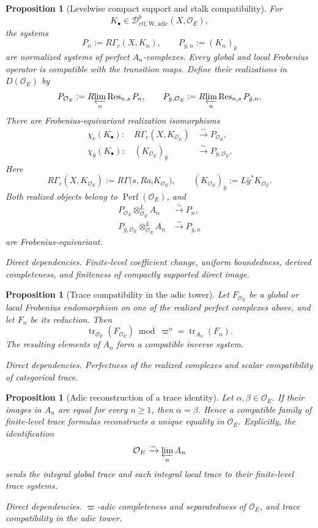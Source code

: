 \documentclass[10pt]{article}
\newtheorem{proposition}[theorem]{Proposition}
\theoremstyle{definition}
\newcommand{\OO}{\mathcal O}
\newcommand{\Perf}{\operatorname{Perf}}
\newcommand{\RGammac}{R\Gamma_c}
\newcommand{\depends}[1]{\par\smallskip\noindent\textit{Direct dependencies.} #1\par}
\begin{document}
\begin{proposition}[Levelwise compact support and stalk compatibility]
For
\[
 K_\bullet\in
 \mathcal D^b_{\mathrm{ctf,W,adic}}(X,\OO_E),
\]
the systems
\[
 P_n:=\RGammac(X,K_n),\qquad
 P_{\bar y,n}:=(K_n)_{\bar y}
\]
are normalized systems of perfect \(A_n\)-complexes.  Every global and local
Frobenius operator is compatible with the transition maps.  Define their
realizations in \(D(\OO_E)\) by
\[
 P_{\OO_E}:=
 R\!\varprojlim_n\operatorname{Res}_{n,s}P_n,\qquad
 P_{\bar y,\OO_E}:=
 R\!\varprojlim_n\operatorname{Res}_{n,s}P_{\bar y,n}.
\]
There are Frobenius-equivariant realization isomorphisms
\[
\begin{aligned}
 \chi_c(K_\bullet):\quad
 \RGammac(X,K_{\OO_E})
 &\xrightarrow{\sim}P_{\OO_E},\\
 \chi_{\bar y}(K_\bullet):\quad
 (K_{\OO_E})_{\bar y}
 &\xrightarrow{\sim}P_{\bar y,\OO_E}.
\end{aligned}
\]
Here
\[
 \RGammac(X,K_{\OO_E})
 :=R\Gamma\bigl(s,Ra_!K_{\OO_E}\bigr),
 \qquad
 (K_{\OO_E})_{\bar y}:=L\bar y^*K_{\OO_E}.
\]
Both realized objects belong to \(\Perf(\OO_E)\), and
\[
\begin{aligned}
P_{\OO_E}\otimes_{\OO_E}^LA_n&\xrightarrow{\sim}P_n,\\
P_{\bar y,\OO_E}\otimes_{\OO_E}^LA_n&\xrightarrow{\sim}P_{\bar y,n}
\end{aligned}
\]
are Frobenius-equivariant.
\depends{Finite-level coefficient change, uniform boundedness, derived
completeness, and finiteness of compactly supported direct image.}
\end{proposition}

\begin{proposition}[Trace compatibility in the adic tower]
Let \(F_{\OO_E}\) be a global or local Frobenius endomorphism on one of the
realized perfect complexes above, and let \(F_n\) be its reduction.  Then
\[
 \operatorname{tr}_{\OO_E}(F_{\OO_E})
 \bmod\varpi^n
 =
 \operatorname{tr}_{A_n}(F_n).
\]
The resulting elements of \(A_n\) form a compatible inverse system.
\depends{Perfectness of the realized complexes and scalar compatibility of
categorical trace.}
\end{proposition}

\begin{proposition}[Adic reconstruction of a trace identity]
Let \(\alpha,\beta\in\OO_E\).  If their images in \(A_n\) are equal for
every \(n\geq1\), then \(\alpha=\beta\).  Hence a compatible family of
finite-level trace formulas reconstructs a unique equality in \(\OO_E\).
Explicitly, the identification
\[
 \OO_E\xrightarrow{\sim}\varprojlim_nA_n
\]
sends the integral global trace and each integral local trace to their
finite-level trace systems.
\depends{\(\varpi\)-adic completeness and separatedness of \(\OO_E\), and
trace compatibility in the adic tower.}
\end{proposition}
\end{document}

